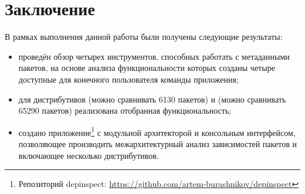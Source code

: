
\section*{Заключение}
В рамках выполнения данной работы были получены следующие результаты:

\begin{itemize}
	\item проведён обзор четырех инструментов, способных работать с метаданными пакетов, на основе анализа функциональности которых созданы четыре доступные для конечного пользователя команды приложения;
	\item для дистрибутивов {\ubuntu} (можно сравнивать 6130 пакетов) и {\fedora} (можно сравнивать 65290 пакетов) реализована отобранная функциональность;
	\item создано приложение\footnote{Репозиторий depinspect: \href{https://github.com/artem-burashnikov/depinspect}{https://github.com/artem-burashnikov/depinspect}} с модульной архитекторой и консольным интерфейсом, позволяющее производить межархитектурный анализ зависимостей пакетов и включающее несколько дистрибутивов.
\end{itemize}
